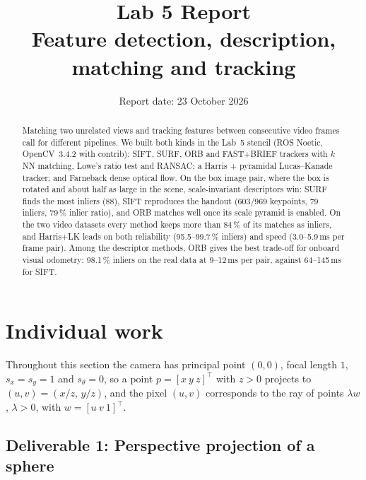 \documentclass[11pt,a4paper]{article}
\title{Lab 5 Report\\[0.3em]\large Feature detection, description, matching and tracking}
\author{\studentname}
\date{Report date: 23 October 2026}
\DeclareRobustCommand{\code}[1]{\begingroup\ttfamily\codebreaks#1\endgroup}
\newcommand{\codebreaks}{\renewcommand{\_}{\textunderscore\allowbreak}}
\begin{document}
\maketitle

\begin{abstract}
Matching two unrelated views and tracking features between consecutive video frames
call for different pipelines. We built both kinds in the Lab~5 stencil (ROS Noetic,
OpenCV~3.4.2 with contrib): SIFT, SURF, ORB and FAST+BRIEF trackers with $k$NN
matching, Lowe's ratio test and RANSAC; a Harris + pyramidal Lucas--Kanade tracker; and
Farneback dense optical flow. On the \code{box} image pair, where the box is rotated and
about half as large in the scene, scale-invariant descriptors win: SURF finds the most
inliers (88), SIFT reproduces the handout (603/969 keypoints, 79 inliers, 79\,\% inlier
ratio), and ORB matches well once its scale pyramid is enabled. On the two video
datasets every method keeps more than 84\,\% of its matches as inliers, and Harris+LK
leads on both reliability (95.5--99.7\,\% inliers) and speed (3.0--5.9\,ms per frame
pair). Among the descriptor methods, ORB gives the best trade-off for onboard visual
odometry: 98.1\,\% inliers on the real data at 9--12\,ms per pair, against 64--145\,ms
for SIFT.
\end{abstract}


\section{Individual work}

Throughout this section the camera has principal point $(0,0)$, focal length $1$,
$s_x=s_y=1$ and $s_\theta=0$, so a point $p=[x\ y\ z]^\top$ with $z>0$ projects to
$(u,v)=(x/z,\,y/z)$, and the pixel $(u,v)$ corresponds to the ray of points
$\lambda w$, $\lambda>0$, with $w=[u\ v\ 1]^\top$.

\subsection{Deliverable 1: Perspective projection of a sphere}
\end{document}
